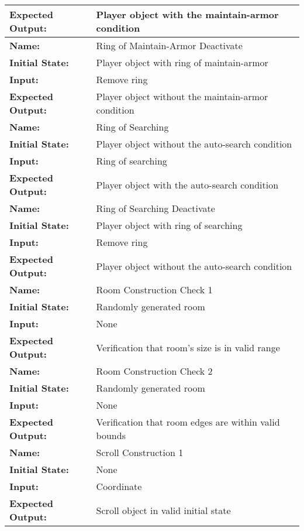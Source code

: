 \documentclass[12pt, titlepage]{article}
\begin{document}
\begin{center}
\begin{longtable}{ l | p{10cm} }
				\textbf{Expected Output:} & Player object with the maintain-armor condition\\[0.6em]
				\hline
				\rule{0pt}{1.5em}\textbf{Name:} & Ring of Maintain-Armor Deactivate\\
				\textbf{Initial State:} & Player object with ring of maintain-armor\\
				\textbf{Input:} & Remove ring\\
				\textbf{Expected Output:} & Player object without the maintain-armor condition\\[0.6em]
				\hline
				\rule{0pt}{1.5em}\textbf{Name:} & Ring of Searching\\
				\textbf{Initial State:} & Player object without the auto-search condition\\
				\textbf{Input:} & Ring of searching\\
				\textbf{Expected Output:} & Player object with the auto-search condition\\[0.6em]
				\hline
				\rule{0pt}{1.5em}\textbf{Name:} & Ring of Searching Deactivate\\
				\textbf{Initial State:} & Player object with ring of searching\\
				\textbf{Input:} & Remove ring\\
				\textbf{Expected Output:} & Player object without the auto-search condition\\[0.6em]
				\hline
				\rule{0pt}{1.5em}\textbf{Name:} & Room Construction Check 1\\
				\textbf{Initial State:} & Randomly generated room\\
				\textbf{Input:} & None\\
				\textbf{Expected Output:} & Verification that room's size is in valid range\\[0.6em]
				\hline
				\rule{0pt}{1.5em}\textbf{Name:} & Room Construction Check 2\\
				\textbf{Initial State:} & Randomly generated room\\
				\textbf{Input:} & None\\
				\textbf{Expected Output:} & Verification that room edges are within valid bounds\\[0.6em]
				\hline
				\rule{0pt}{1.5em}\textbf{Name:} & Scroll Construction 1\\
				\textbf{Initial State:} & None\\
				\textbf{Input:} & Coordinate\\
				\textbf{Expected Output:} & Scroll object in valid initial state\\[0.6em]

\end{longtable}
\end{center}
\end{document}
